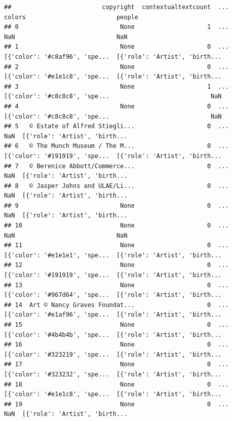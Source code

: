 \documentclass[
]{book}
\begin{document}
\begin{verbatim}
##                         copyright  contextualtextcount  ...                         colors                         people
## 0                            None                    1  ...                            NaN                            NaN
## 1                            None                    0  ...  [{'color': '#c8af96', 'spe...  [{'role': 'Artist', 'birth...
## 2                            None                    0  ...  [{'color': '#e1e1c8', 'spe...  [{'role': 'Artist', 'birth...
## 3                            None                    1  ...  [{'color': '#c8c8c8', 'spe...                            NaN
## 4                            None                    0  ...  [{'color': '#c8c8c8', 'spe...                            NaN
## 5   © Estate of Alfred Stiegli...                    0  ...                            NaN  [{'role': 'Artist', 'birth...
## 6   © The Munch Museum / The M...                    0  ...  [{'color': '#191919', 'spe...  [{'role': 'Artist', 'birth...
## 7   © Berenice Abbott/Commerce...                    0  ...                            NaN  [{'role': 'Artist', 'birth...
## 8   © Jasper Johns and ULAE/Li...                    0  ...                            NaN  [{'role': 'Artist', 'birth...
## 9                            None                    0  ...                            NaN  [{'role': 'Artist', 'birth...
## 10                           None                    0  ...                            NaN                            NaN
## 11                           None                    0  ...  [{'color': '#e1e1e1', 'spe...  [{'role': 'Artist', 'birth...
## 12                           None                    0  ...  [{'color': '#191919', 'spe...  [{'role': 'Artist', 'birth...
## 13                           None                    0  ...  [{'color': '#967d64', 'spe...  [{'role': 'Artist', 'birth...
## 14  Art © Nancy Graves Foundat...                    0  ...  [{'color': '#e1af96', 'spe...  [{'role': 'Artist', 'birth...
## 15                           None                    0  ...  [{'color': '#4b4b4b', 'spe...  [{'role': 'Artist', 'birth...
## 16                           None                    0  ...  [{'color': '#323219', 'spe...  [{'role': 'Artist', 'birth...
## 17                           None                    0  ...  [{'color': '#323232', 'spe...  [{'role': 'Artist', 'birth...
## 18                           None                    0  ...  [{'color': '#e1e1c8', 'spe...  [{'role': 'Artist', 'birth...
## 19                           None                    0  ...                            NaN  [{'role': 'Artist', 'birth...

\end{verbatim}
\end{document}
